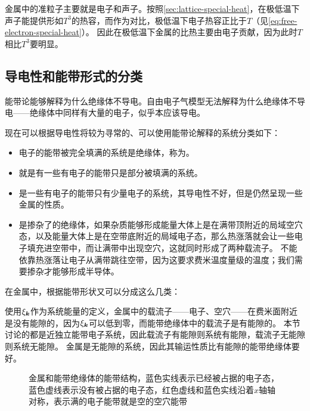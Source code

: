 
金属中的准粒子主要就是电子和声子。按照\autoref{sec:lattice-special-heat}，在极低温下声子能提供形如$T^3$的热容，而作为对比，极低温下电子热容正比于$T$（见\eqref{eq:free-electron-special-heat}）。
因此在极低温下金属的比热主要由电子贡献，因为此时$T$相比$T^3$要明显。

\subsection{导电性和能带形式的分类}\label{sec:conductor-classification}

能带论能够解释为什么绝缘体不导电。自由电子气模型无法解释为什么绝缘体不导电——绝缘体中同样有大量的电子，似乎本应该导电。


现在可以根据导电性将较为寻常的、可以使用能带论解释的系统分类如下：
\begin{itemize}
    \item 电子的能带被完全填满的系统是绝缘体，称为。
    \item {}就是有一些有电子的能带只是部分被填满的系统。
    \item {}是一些有电子的能带只有少量电子的系统，其导电性不好，但是仍然呈现一些金属的性质。
    \item {}是掺杂了的绝缘体，如果杂质能够形成能量大体上是在满带顶附近的局域空穴态，以及能量大体上是在空带底附近的局域电子态，那么热涨落就会让一些电子填充进空带中，而让满带中出现空穴，这就同时形成了两种载流子。
    不能依靠热涨落让电子从满带跳往空带，因为这要求费米温度量级的温度；我们需要掺杂才能够形成半导体。
\end{itemize}

在金属中，根据能带形状又可以分成这么几类：

使用$\xi_{\vb*{k}}$作为系统能量的定义，金属中的载流子——电子、空穴——在费米面附近是没有能隙的，因为$\xi_{\vb*{k}}$可以低到零，而能带绝缘体中的载流子是有能隙的。
本节讨论的都是近独立能带电子系统，因此载流子有能隙则系统有能隙，载流子无能隙则系统无能隙。
金属是无能隙的系统，因此其输运性质比有能隙的能带绝缘体要好。

\begin{figure}
    \centering
    \caption{金属和能带绝缘体的能带结构，蓝色实线表示已经被占据的电子态，蓝色虚线表示没有被占据的电子态，红色虚线和蓝色实线沿着$x$轴轴对称，表示满的电子能带就是空的空穴能带}
\end{figure}

